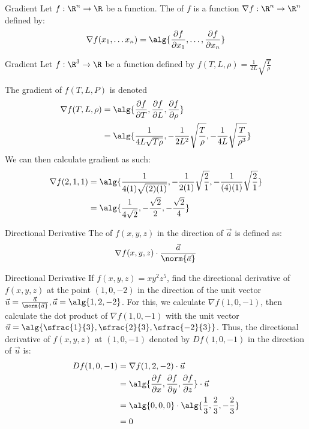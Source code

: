 \documentclass[math]{amznotes}
\begin{document}
\begin{dfnbox}{Gradient}{}
    Let $f : \R^n \to \R$ be a function. The  of $f$ is a function $\nabla f : \R^n \to \R^n$ defined by:
    \[ \nabla f(x_1, \ldots x_n) = \alg{ \frac{\partial f}{\partial x_1} , \ldots , \frac{\partial f}{\partial x_n} } \]
\end{dfnbox}

\begin{exbox}{Gradient}{}
    Let $f : \R^3 \to \R$ be a function defined by $f(T,L,\rho) = \frac{1}{2L} \sqrt{\frac{T}{\rho}}$

    The gradient of $f(T,L,P)$ is denoted
    \begin{align*}
        \nabla f(T,L,\rho)
        &= \alg{\frac{\partial f}{\partial T}, \frac{\partial f}{\partial L}, \frac{\partial f}{\partial \rho}} \\
        &= \alg{\frac{1}{4L\sqrt{T \rho}}, -\frac{1}{2L^2} \sqrt{\frac{T}{\rho}}, -\frac{1}{4L} \sqrt{\frac{T}{\rho^3}}}
    \end{align*}
    We can then calculate gradient as such:
    \begin{align*}
        \nabla f(2,1,1)
        &= \alg{ \frac{1}{4(1)\sqrt{(2)(1)}} , -\frac{1}{2(1)}\sqrt{\frac{2}{1}} , -\frac{1}{(4)(1)} \sqrt{\frac{2}{1}} } \\
        &= \alg{ \frac{1}{4\sqrt{2}} , -\frac{\sqrt{2}}{2} , - \frac{\sqrt{2}}{4} }
    \end{align*}
\end{exbox}

\begin{dfnbox}{Directional Derivative}{}
    The  of $f(x,y,z)$ in the direction of $\vec{a}$ is defined as:
    \[ \nabla f(x,y,z) \cdot \frac{\vec{a}}{\norm{\vec{a}}} \]
\end{dfnbox}

\begin{exbox}{Directional Derivative}{}
    If $f(x,y,z) = xy^2z^5$, find the directional derivative of $f(x,y,z)$ at the point $(1,0,-2)$ in the direction of the unit vector $\vec{u} = \frac{\vec{a}}{\norm{\vec{a}}}, \vec{a} = \alg{1,2,-2}$.
    \tcblower
    For this, we calculate $\nabla f(1,0,-1)$, then calculate the dot product of $\nabla f(1,0,-1)$ with the unit vector $\vec{u} = \alg{\sfrac{1}{3}, \sfrac{2}{3}, \sfrac{-2}{3}}$. Thus, the directional derivative of $f(x,y,z)$ at $(1,0,-1)$ denoted by $Df(1,0,-1)$ in the direction of $\vec{u}$ is:
    \begin{align*}
        Df(1,0,-1)
        &= \nabla f(1,2,-2) \cdot \vec{u} \\
        &= \alg{\frac{\partial f}{\partial x}, \frac{\partial f}{\partial y}, \frac{\partial f}{\partial z}} \cdot \vec{u} \\
        &= \alg{0,0,0} \cdot \alg{\frac13, \frac23, -\frac23} \\
        &= 0
    \end{align*}
\end{exbox}
\end{document}
